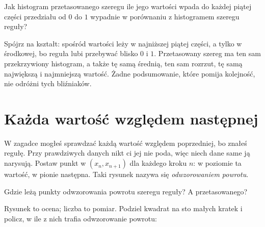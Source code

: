 \begin{think}
Jak histogram przetasowanego szeregu \dash{} ile jego wartości wpada do każdej
piątej części przedziału od $0$ do $1$ \dash{} wypadnie w porównaniu z
histogramem szeregu reguły?
\end{think}


\noindent
Spójrz na kształt:  spośród  wartości leży w
najniższej piątej części, a tylko  w środkowej, bo reguła
lubi przebywać blisko $0$ i $1$. Przetasowany szereg ma ten sam przekrzywiony
histogram, a także tę samą średnią, ten sam rozrzut, tę samą największą i
najmniejszą wartość. Żadne podsumowanie, które pomija kolejność, nie odróżni
tych bliźniaków.


\section{Każda wartość względem następnej}
\label{sec:ch15-return}

\noindent
W zagadce mogłeś sprawdzać każdą wartość względem poprzedniej, bo znałeś
regułę. Przy prawdziwych danych nikt ci jej nie poda, więc niech dane same ją
narysują. Postaw punkt w $(x_n, x_{n+1})$ dla każdego kroku $n$: w poziomie
ta wartość, w pionie następna. Taki rysunek nazywa się \emph{odwzorowaniem
powrotu}.

\begin{think}
Gdzie leżą punkty odwzorowania powrotu szeregu reguły? A przetasowanego?
\end{think}


\noindent
Rysunek to ocena; liczba to pomiar. Podziel kwadrat na sto małych kratek i
policz, w ile z nich trafia odwzorowanie powrotu:

